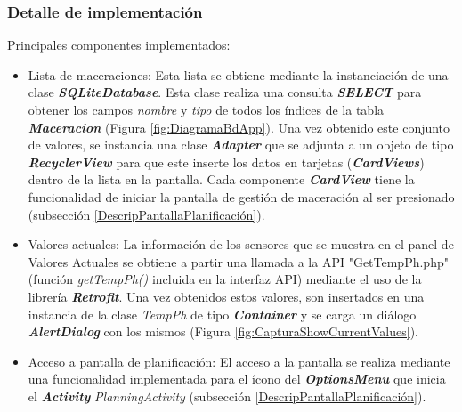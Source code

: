             \subsubsection{Detalle de implementación}
                Principales componentes implementados:
                \begin{itemize}
                    \item Lista de maceraciones: Esta lista se obtiene mediante la instanciación de una clase \textbf{\textit{\gls{SQLiteDatabase}}}. Esta clase realiza una consulta \textbf{\textit{\gls{SELECT}}} para obtener los campos \textit{nombre} y \textit{tipo} de todos los índices de la tabla \textbf{\textit{Maceracion}} (Figura \ref{fig:DiagramaBdApp}). Una vez obtenido este conjunto de valores, se instancia una clase \textbf{\textit{\gls{Adapter}}} que se adjunta a un objeto de tipo \textbf{\textit{\gls{RecyclerView}}} para que este inserte los datos en tarjetas (\textbf{\textit{\gls{CardView}s}}) dentro de la lista en la pantalla. Cada componente \textbf{\textit{\gls{CardView}}} tiene la funcionalidad de iniciar la pantalla de gestión de maceración al ser presionado (subsección \ref{DescripPantallaPlanificación}).
                 
                    \item Valores actuales: La información de los sensores que se muestra en el panel de Valores Actuales se obtiene a partir una llamada a la API "GetTempPh.php" (función \textit{getTempPh()} incluida en la interfaz API) mediante el uso de la librería \textbf{\textit{\gls{Retrofit}}}. Una vez obtenidos estos valores, son insertados en una instancia de la clase \textit{TempPh} de tipo \textbf{\textit{\gls{Container}}} y se carga un diálogo \textbf{\textit{\gls{AlertDialog}}} con los mismos (Figura \ref{fig:CapturaShowCurrentValues}).
                    
                    \item Acceso a pantalla de planificación: El acceso a la pantalla se realiza mediante una funcionalidad implementada para el ícono del \textbf{\textit{\gls{OptionsMenu}}} que inicia el \textbf{\textit{\gls{Activity}}} \textit{PlanningActivity} (subsección \ref{DescripPantallaPlanificación}).
                    
                \end{itemize}
                

